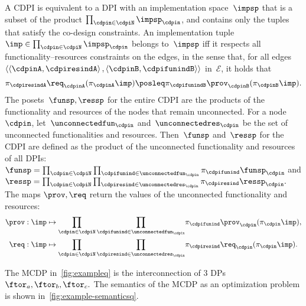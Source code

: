 A CDPI is equivalent to a DPI with an implementation space~$\impsp$
that is a subset of the product $\prod_{\cdpin\in\cdpiN}\impsp_{\cdpin}$,
and contains only the tuples that satisfy the co-design constraints.
An implementation tuple~$\imp\in\prod_{\cdpin\in\cdpiN}\impsp_{\cdpin}$
belongs to~$\impsp$ iff it respects all functionality--resources
constraints on the edges, in the sense that, for all edges~$\left\langle \left\langle \cdpinA,\cdpiresindA\right\rangle ,\left\langle \cdpinB,\cdpifunindB\right\rangle \right\rangle $
in~$\mathcal{E}$, it holds that
\[
  \pi_{\cdpiresindA}\req_{\cdpinA}(\pi_{\cdpinA}\imp)\posleq\pi_{\cdpifunindB}\prov_{\cdpinB}(\pi_{\cdpinB}\imp).
\]
The posets~$\funsp,\ressp$ for the entire CDPI are the products
of the functionality and resources of the nodes that remain unconnected.
For a node~$\cdpin$, let~$\unconnectedfun_{\cdpin}$ and~$\unconnectedres_{\cdpin}$
be the set of unconnected functionalities and resources. Then~$\funsp$
and~$\ressp$ for the CDPI are defined as the product of the unconnected
functionality and resources of all DPIs: $\funsp=\prod_{\cdpin\in\cdpiN}\prod_{\cdpifunind\in\unconnectedfun_{\cdpin}}\pi_{\cdpifunind}\funsp_{\cdpin}$
and $\ressp=\prod_{\cdpin\in\cdpiN}\prod_{\cdpiresind\in\unconnectedres_{\cdpin}}\pi_{\cdpiresind}\ressp_{\cdpin}.$
The maps $\prov,\req$ return the values of the unconnected functionality
and resources:
\begin{align*}
  \prov:\imp & \mapsto{\scriptstyle {\displaystyle \prod_{\cdpin\in\cdpiN}\prod_{\cdpifunind\in\unconnectedfun_{\cdpin}}}}\pi_{\cdpifunind}\prov_{\cdpin}(\pi_{\cdpin}\imp),\\
  \req:\imp & \mapsto{\displaystyle \prod_{\cdpin\in\cdpiN}\prod_{\cdpiresind\in\unconnectedres_{\cdpin}}}\pi_{\cdpiresind}\req_{\cdpin}(\pi_{\cdpin}\imp).
\end{align*}

\begin{example}
    The MCDP in~\cref{fig:exampleq} is the interconnection of 3
    DPs $\ftor_{a},\ftor_{b},\ftor_{c}.$ The semantics of the MCDP as
    an optimization problem is shown in~\cref{fig:example-semanticsq}.
\end{example}

\\



